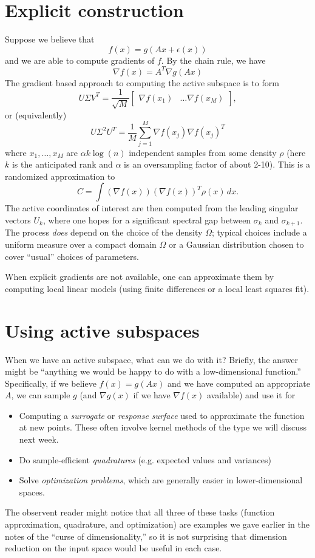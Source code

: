 \documentclass[12pt, leqno]{article} %
\begin{document}
\section{Explicit construction}

Suppose we believe that
\[
  f(x) = g(Ax + \epsilon(x))
\]
and we are able to compute gradients of $f$.  By the chain rule, we
have
\[
  \nabla f(x) = A^T \nabla g(Ax)
\]
The gradient based approach to computing the active subspace is to
form
\[
  U \Sigma V^T =
  \frac{1}{\sqrt{M}}
  \begin{bmatrix} \nabla f(x_1) & \ldots \nabla f(x_M) \end{bmatrix},
\]
or (equivalently)
\[
  U \Sigma^2 U^T = \frac{1}{M}
    \sum_{j=1}^M \nabla f(x_j) \nabla f(x_j)^T
\]
where $x_1, \ldots, x_M$ are $\alpha k \log(n)$ independent samples
from some density $\rho$ (here $k$ is the anticipated rank and
$\alpha$ is an oversampling factor of about 2-10).  This is a
randomized approximation to
\[
  C = \int (\nabla f(x)) (\nabla f(x))^T \rho(x) \, dx.
\]
The active coordinates of interest are then computed from the leading
singular vectors $U_k$, where one hopes for a significant spectral gap
between $\sigma_k$ and $\sigma_{k+1}$.  The process {\em does} depend
on the choice of the density $\Omega$; typical choices include a
uniform measure over a compact domain $\Omega$ or a Gaussian
distribution chosen to cover ``usual'' choices of parameters.

When explicit gradients are not available, one can approximate them by
computing local linear models (using finite differences or a local
least squares fit).

\section{Using active subspaces}

When we have an active subspace, what can we do with it?  Briefly, the
answer might be ``anything we would be happy to do with a
low-dimensional function.''  Specifically, if we believe
$f(x) = g(Ax)$ and we have computed an appropriate $A$,
we can sample $g$ (and $\nabla g(x)$ if we have $\nabla f(x)$
available) and use it for
\begin{itemize}
\item Computing a {\em surrogate} or {\em response surface} used to
  approximate the function at new points.  These often involve kernel
  methods of the type we will discuss next week.
\item Do sample-efficient {\em quadratures} (e.g. expected values and variances)
\item Solve {\em optimization problems}, which are generally easier in
  lower-dimensional spaces.
\end{itemize}
The observent reader might notice that all three of these tasks
(function approximation, quadrature, and optimization) are examples we
gave earlier in the notes of the ``curse of dimensionality,''
so it is not surprising that dimension reduction on the input space
would be useful in each case.
\end{document}
